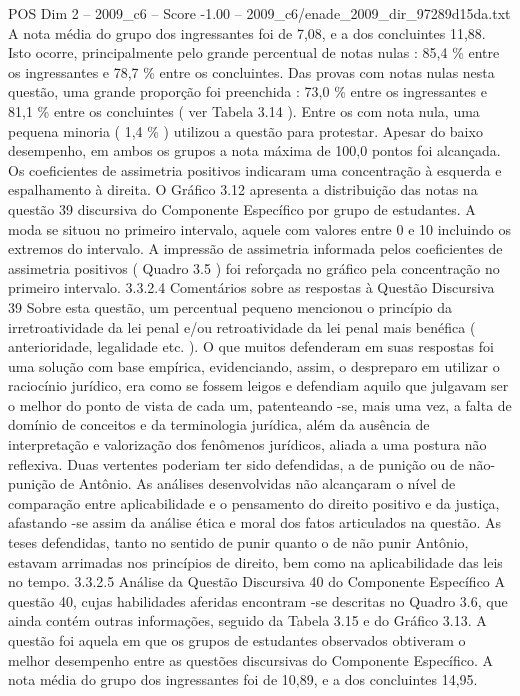 \begin{textsample}{POS Dim 2 – 2009\_c6 – Score -1.00 – 2009\_c6/enade\_2009\_dir\_97289d15da.txt}
A nota média do grupo dos ingressantes foi de 7,08, e a dos concluintes 11,88.
Isto ocorre, principalmente pelo grande percentual de notas nulas : 85,4 \% entre os ingressantes e 78,7 \% entre os concluintes.
Das provas com notas nulas nesta questão, uma grande proporção foi preenchida : 73,0 \% entre os ingressantes e 81,1 \% entre os concluintes ( ver Tabela 3.14 ).
Entre os com nota nula, uma pequena minoria ( 1,4 \% ) utilizou a questão para protestar.
Apesar do baixo desempenho, em ambos os grupos a nota máxima de 100,0 pontos foi alcançada.
Os coeficientes de assimetria positivos indicaram uma concentração à esquerda e espalhamento à direita.
O Gráfico 3.12 apresenta a distribuição das notas na questão 39 discursiva do Componente Específico por grupo de estudantes.
A moda se situou no primeiro intervalo, aquele com valores entre 0 e 10 incluindo os extremos do intervalo.
A impressão de assimetria informada pelos coeficientes de assimetria positivos ( Quadro 3.5 ) foi reforçada no gráfico pela concentração no primeiro intervalo. 3.3.2.4 Comentários sobre as respostas à Questão Discursiva 39 Sobre esta questão, um percentual pequeno mencionou o princípio da irretroatividade da lei penal e/ou retroatividade da lei penal mais benéfica ( anterioridade, legalidade etc. ).
O que muitos defenderam em suas respostas foi uma solução com base empírica, evidenciando, assim, o despreparo em utilizar o raciocínio jurídico, era como se fossem leigos e defendiam aquilo que julgavam ser o melhor do ponto de vista de cada um, patenteando -se, mais uma vez, a falta de domínio de conceitos e da terminologia jurídica, além da ausência de interpretação e valorização dos fenômenos jurídicos, aliada a uma postura não reflexiva.
Duas vertentes poderiam ter sido defendidas, a de punição ou de não-punição de Antônio.
As análises desenvolvidas não alcançaram o nível de comparação entre aplicabilidade e o pensamento do direito positivo e da justiça, afastando -se assim da análise ética e moral dos fatos articulados na questão.
As teses defendidas, tanto no sentido de punir quanto o de não punir Antônio, estavam arrimadas nos princípios de direito, bem como na aplicabilidade das leis no tempo. 3.3.2.5 Análise da Questão Discursiva 40 do Componente Específico A questão 40, cujas habilidades aferidas encontram -se descritas no Quadro 3.6, que ainda contém outras informações, seguido da Tabela 3.15 e do Gráfico 3.13.
A questão foi aquela em que os grupos de estudantes observados obtiveram o melhor desempenho entre as questões discursivas do Componente Específico.
A nota média do grupo dos ingressantes foi de 10,89, e a dos concluintes 14,95.

\end{textsample}
